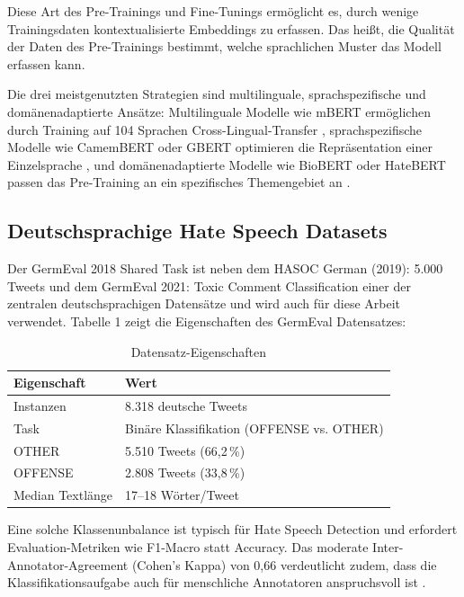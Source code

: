 ﻿\documentclass[11pt,a4paper]{article}
\begin{document}
Diese Art des Pre-Trainings und Fine-Tunings ermöglicht es, durch wenige Trainingsdaten kontextualisierte Embeddings zu erfassen. Das heißt, die Qualität der Daten des Pre-Trainings bestimmt, welche sprachlichen Muster das Modell erfassen kann.

Die drei meistgenutzten Strategien sind multilinguale, sprachspezifische und domänenadaptierte Ansätze: Multilinguale Modelle wie mBERT ermöglichen durch Training auf 104 Sprachen Cross-Lingual-Transfer \parencite{pires2019}, sprachspezifische Modelle wie CamemBERT oder GBERT optimieren die Repräsentation einer Einzelsprache \parencite{chan2020}, und domänenadaptierte Modelle wie BioBERT oder HateBERT passen das Pre-Training an ein spezifisches Themengebiet an \parencite{caselli2021}.  


\subsection{Deutschsprachige Hate Speech Datasets}

Der GermEval 2018 Shared Task \parencite{wiegand2018} ist neben dem HASOC German (2019): 5.000 Tweets und dem GermEval 2021: Toxic Comment Classification einer der zentralen deutschsprachigen Datensätze und wird auch für diese Arbeit verwendet. Tabelle 1 zeigt die Eigenschaften des GermEval Datensatzes: 

\begin{table}[h]
\centering
\begin{tabular}{ll}
\toprule
\textbf{Eigenschaft} & \textbf{Wert} \\
\midrule
Instanzen & 8.318 deutsche Tweets \\
Task & Binäre Klassifikation (OFFENSE vs. OTHER) \\
OTHER & 5.510 Tweets (66,2\,\%) \\
OFFENSE & 2.808 Tweets (33,8\,\%) \\
Median Textlänge & 17--18 Wörter/Tweet \\
\bottomrule
\end{tabular}
\caption{Datensatz-Eigenschaften}
\end{table}

Eine solche Klassenunbalance ist typisch für Hate Speech Detection und erfordert Evaluation-Metriken wie F1-Macro statt Accuracy. Das moderate Inter-Annotator-Agreement (Cohen's Kappa) von 0,66 verdeutlicht zudem, dass die Klassifikationsaufgabe auch für menschliche Annotatoren anspruchsvoll ist \parencite{wiegand2018}.
\end{document}

